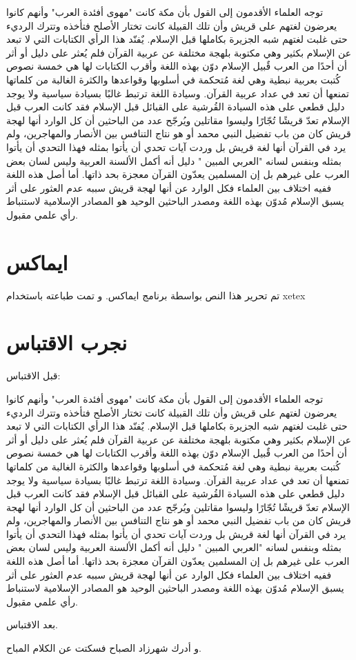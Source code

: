 \documentclass[12pt]{article}
\begin{document}
توجه العلماء الأقدمون إلى القول بأن مكة كانت "مهوى أفئدة العرب" وأنهم كانوا يعرضون لغتهم على قريش وأن تلك القبيلة كانت تختار الأصلح فتأخذه وتترك الرديء حتى غلبت لغتهم شبه الجزيرة بكاملها قبل الإسلام.
يٌفنّد هذا الرأي الكتابات التي لا تبعد عن الإسلام بكثير وهي مكتوبة بلهجة مختلفة عن عربية القرآن فلم يُعثر على دليل أو أثر أن أحدًا من العرب قٌبيل الإسلام دوّن بهذه اللغة وأقرب الكتابات لها هي خمسة نصوص كُتبت بعربية نبطية وهي لغة مُتحكمة في أسلوبها وقواعدها والكثرة الغالبة من كلماتها تمنعها أن تعد في عداد عربية القرآن. وسيادة اللغة ترتبط غالبًا بسيادة سياسية ولا يوجد دليل قطعي على هذه السيادة القُرشية على القبائل قبل الإسلام فقد كانت العرب قبل الإسلام تعدّ قريشًا تُجّارًا وليسوا مقاتلين ويُرجّح عدد من الباحثين أن كل الوارد أنها لهجة قريش كان من باب تفضيل النبي محمد أو هو نتاج التنافس بين الأنصار والمهاجرين، ولم يرد في القرآن أنها لغة قريش بل وردت آيات تحدي أن يأتوا بمثله فهذا التحدي أن يأتوا بمثله وبنفس لسانه "العربي المبين " دليل أنه أكمل الألسنة العربية وليس لسان بعض العرب على غيرهم بل إن المسلمين يعدّون القرآن معجزة بحد ذاتها. أما أصل هذه اللغة ففيه اختلاف بين العلماء فكل الوارد عن أنها لهجة قريش سببه عدم العثور على أثر يسبق الإسلام مُدوّن بهذه اللغة ومصدر الباحثين الوحيد هو المصادر الإسلامية لاستنباط رأي علمي مقبول.


\section{ايماكس}

تم تحرير هذا النص بواسطة برنامج ايماكس. و تمت طباعته باستخدام xetex


\section{نجرب الاقتباس}

قبل الاقتباس:
\begin{quoting}
توجه العلماء الأقدمون إلى القول بأن مكة كانت "مهوى أفئدة العرب" وأنهم كانوا يعرضون لغتهم على قريش وأن تلك القبيلة كانت تختار الأصلح فتأخذه وتترك الرديء حتى غلبت لغتهم شبه الجزيرة بكاملها قبل الإسلام.
يٌفنّد هذا الرأي الكتابات التي لا تبعد عن الإسلام بكثير وهي مكتوبة بلهجة مختلفة عن عربية القرآن فلم يُعثر على دليل أو أثر أن أحدًا من العرب قٌبيل الإسلام دوّن بهذه اللغة وأقرب الكتابات لها هي خمسة نصوص كُتبت بعربية نبطية وهي لغة مُتحكمة في أسلوبها وقواعدها والكثرة الغالبة من كلماتها تمنعها أن تعد في عداد عربية القرآن. وسيادة اللغة ترتبط غالبًا بسيادة سياسية ولا يوجد دليل قطعي على هذه السيادة القُرشية على القبائل قبل الإسلام فقد كانت العرب قبل الإسلام تعدّ قريشًا تُجّارًا وليسوا مقاتلين ويُرجّح عدد من الباحثين أن كل الوارد أنها لهجة قريش كان من باب تفضيل النبي محمد أو هو نتاج التنافس بين الأنصار والمهاجرين، ولم يرد في القرآن أنها لغة قريش بل وردت آيات تحدي أن يأتوا بمثله فهذا التحدي أن يأتوا بمثله وبنفس لسانه "العربي المبين " دليل أنه أكمل الألسنة العربية وليس لسان بعض العرب على غيرهم بل إن المسلمين يعدّون القرآن معجزة بحد ذاتها. أما أصل هذه اللغة ففيه اختلاف بين العلماء فكل الوارد عن أنها لهجة قريش سببه عدم العثور على أثر يسبق الإسلام مُدوّن بهذه اللغة ومصدر الباحثين الوحيد هو المصادر الإسلامية لاستنباط رأي علمي مقبول.
\end{quoting}
بعد الاقتباس.

و أدرك شهرزاد الصباح فسكتت عن الكلام المباح.
\end{document}
